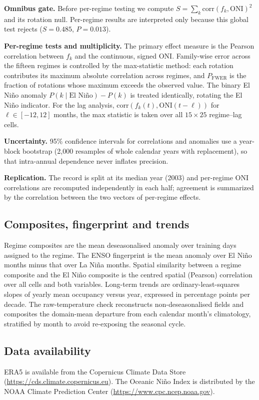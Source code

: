 \documentclass[pdflatex,sn-nature]{sn-jnl}
\begin{document}
\textbf{Omnibus gate.} Before per-regime testing we compute $S = \sum_k \mathrm{corr}(f_k, \mathrm{ONI})^2$ and its rotation null. Per-regime results are interpreted only because this global test rejects ($S = 0.485$, $P = 0.013$).

\textbf{Per-regime tests and multiplicity.} The primary effect measure is the Pearson correlation between $f_k$ and the continuous, signed ONI. Family-wise error across the fifteen regimes is controlled by the max-statistic method: each rotation contributes its maximum absolute correlation across regimes, and $P_{\mathrm{FWER}}$ is the fraction of rotations whose maximum exceeds the observed value. The binary El Ni\~no anomaly $P(k \mid \text{El Ni\~no}) - P(k)$ is treated identically, rotating the El Ni\~no indicator. For the lag analysis, $\mathrm{corr}(f_k(t), \mathrm{ONI}(t-\ell))$ for $\ell \in [-12, 12]$ months, the max statistic is taken over all $15 \times 25$ regime--lag cells.

\textbf{Uncertainty.} 95\% confidence intervals for correlations and anomalies use a year-block bootstrap (2{,}000 resamples of whole calendar years with replacement), so that intra-annual dependence never inflates precision.

\textbf{Replication.} The record is split at its median year (2003) and per-regime ONI correlations are recomputed independently in each half; agreement is summarized by the correlation between the two vectors of per-regime effects.

\subsection{Composites, fingerprint and trends}\label{sec:composites}

Regime composites are the mean deseasonalised anomaly over training days assigned to the regime. The ENSO fingerprint is the mean anomaly over El Ni\~no months minus that over La Ni\~na months. Spatial similarity between a regime composite and the El Ni\~no composite is the centred spatial (Pearson) correlation over all cells and both variables. Long-term trends are ordinary-least-squares slopes of yearly mean occupancy versus year, expressed in percentage points per decade. The raw-temperature check reconstructs non-deseasonalised fields and composites the domain-mean departure from each calendar month's climatology, stratified by month to avoid re-exposing the seasonal cycle.

\subsection{Data availability}
ERA5 is available from the Copernicus Climate Data Store (\url{https://cds.climate.copernicus.eu}). The Oceanic Ni\~no Index is distributed by the NOAA Climate Prediction Center (\url{https://www.cpc.ncep.noaa.gov}).
\end{document}
